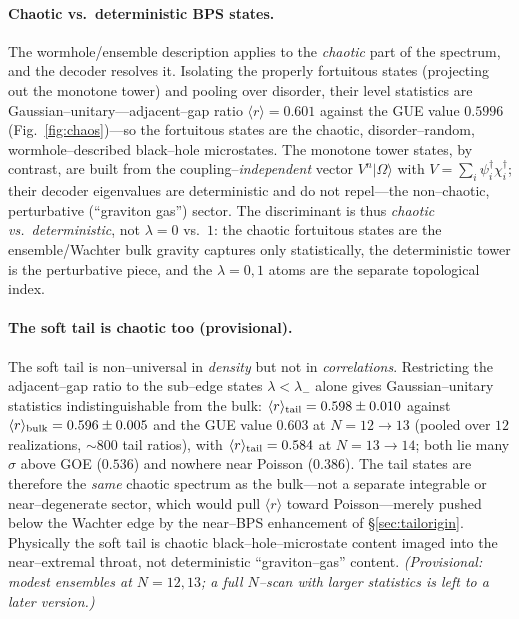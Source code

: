 \documentclass[11pt]{article}
\newcommand{\ket}[1]{\lvert #1\rangle}
\newcommand{\dg}{^{\dagger}}
\begin{document}
\paragraph{Chaotic vs.\ deterministic BPS states.}
The wormhole/ensemble description applies to the \emph{chaotic} part of the spectrum, and the
decoder resolves it. Isolating the properly fortuitous states (projecting out the monotone tower)
and pooling over disorder, their level statistics are Gaussian--unitary---adjacent--gap ratio
$\langle r\rangle=0.601$ against the GUE value $0.5996$ (Fig.~\ref{fig:chaos})---so the fortuitous
states are the chaotic, disorder--random, wormhole--described black--hole microstates. The monotone
tower states, by contrast, are built from the coupling--\emph{independent} vector $V^n\ket\Omega$
with $V=\sum_i\psi_i\dg\chi_i\dg$; their decoder eigenvalues are deterministic and do not repel---the
non--chaotic, perturbative (``graviton gas'') sector. The discriminant is thus \emph{chaotic vs.\
deterministic}, not $\lambda=0$ vs.\ $1$: the chaotic fortuitous states are the ensemble/Wachter bulk
gravity captures only statistically, the deterministic tower is the perturbative piece, and the
$\lambda=0,1$ atoms are the separate topological index.

\paragraph{The soft tail is chaotic too (provisional).}
The soft tail is non--universal in \emph{density} but not in \emph{correlations}. Restricting the
adjacent--gap ratio to the sub--edge states $\lambda<\lambda_-$ alone gives Gaussian--unitary
statistics indistinguishable from the bulk: $\langle r\rangle_{\rm tail}=0.598\pm0.010$ against
$\langle r\rangle_{\rm bulk}=0.596\pm0.005$ and the GUE value $0.603$ at $N=12\!\to\!13$ (pooled over
$12$ realizations, ${\sim}800$ tail ratios), with $\langle r\rangle_{\rm tail}=0.584$ at
$N=13\!\to\!14$; both lie many $\sigma$ above GOE ($0.536$) and nowhere near Poisson ($0.386$). The
tail states are therefore the \emph{same} chaotic spectrum as the bulk---not a separate integrable or
near--degenerate sector, which would pull $\langle r\rangle$ toward Poisson---merely pushed below the
Wachter edge by the near--BPS enhancement of \S\ref{sec:tailorigin}. Physically the soft tail is
chaotic black--hole--microstate content imaged into the near--extremal throat, not deterministic
``graviton--gas'' content. \emph{(Provisional: modest ensembles at $N=12,13$; a full $N$--scan with
larger statistics is left to a later version.)}
\end{document}

